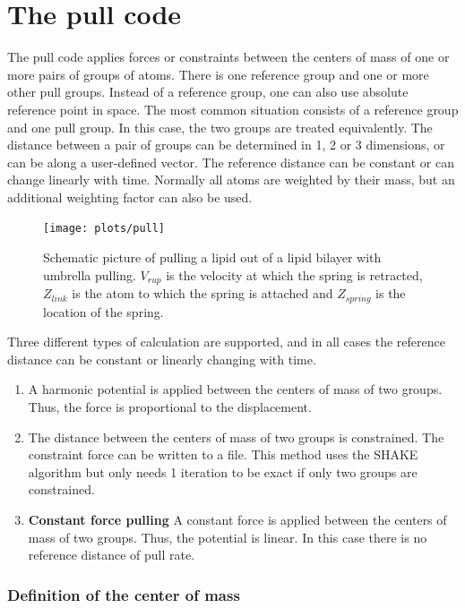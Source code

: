 \section{The pull code}
\label{sec:pull}
The pull code applies forces or constraints between the centers
of mass of one or more pairs of groups of atoms.
There is one reference group and one or more other pull groups.
Instead of a reference group, one can also use absolute reference
point in space.
The most common situation consists of a reference group
and one pull group. In this case, the two groups are treated
equivalently.
The distance between a pair of groups can be determined
in 1, 2 or 3 dimensions, or can be along a user-defined vector.
The reference distance can be constant or can change linearly with time.
Normally all atoms are weighted by their mass, but an additional
weighting factor can also be used.
\begin{figure}
\centerline{\texttt{[image: plots/pull]}}
\caption{Schematic picture of pulling a lipid out of a lipid bilayer
with umbrella pulling. $V_{rup}$ is the velocity at which the spring is
retracted, $Z_{link}$ is the atom to which the spring is attached and
$Z_{spring}$ is the location of the spring.}
\label{fi:pull} 
\end{figure}

Three different types of calculation are supported,
and in all cases the reference distance can be constant
or linearly changing with time.
\begin{enumerate}
\item{\textbf{}}
A harmonic potential is applied between
the centers of mass of two groups.
Thus, the force is proportional to the displacement.
\item{\textbf{}}
The distance between the centers of mass of two groups is constrained.
The constraint force can be written to a file.
This method uses the SHAKE algorithm but only needs 1 iteration to be
exact if only two groups are constrained. 
\item{\textbf{Constant force pulling}}
A constant force is applied between the centers of mass of two groups.
Thus, the potential is linear.
In this case there is no reference distance of pull rate.
\end{enumerate}

\subsubsection{Definition of the center of mass}


